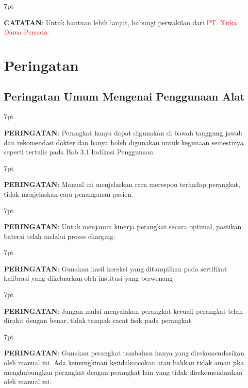 \documentclass[11pt,a4paper,twoside,draft,onecolumn]{book}
\newenvironment{formalred}{%
	\def\FrameCommand{%
		\hspace{1pt}%
		{\color{red}\vrule width 2pt}%
		{\color{formalshade}\vrule width 4pt}%
		\colorbox{formalshade}%
	}%
	\MakeFramed{\advance\hsize-\width\FrameRestore}%
	\noindent\hspace{-4.55pt}%
	\begin{adjustwidth}{}{7pt}%
		\vspace{2pt}\vspace{2pt}%
	}
	{%
		\vspace{2pt}\end{adjustwidth}\endMakeFramed%
}
\newenvironment{formalblue}{%
	\def\FrameCommand{%
		\hspace{1pt}%
		{\color{blue}\vrule width 2pt}%
		{\color{formalshade}\vrule width 4pt}%
		\colorbox{formalshade}%
	}%
	\MakeFramed{\advance\hsize-\width\FrameRestore}%
	\noindent\hspace{-4.55pt}%
	\begin{adjustwidth}{}{7pt}%
		\vspace{2pt}\vspace{2pt}%
	}
	{%
		\vspace{2pt}\end{adjustwidth}\endMakeFramed%
}
\begin{document}
		\begin{formalblue}
			 \textbf{CATATAN}:
			Untuk bantuan lebih lanjut, hubungi perwakilan dari \textcolor{red}{PT. Xirka Dama Persada} 
		\end{formalblue}
		
		\section{Peringatan}\label{sec:2.2}
			\subsection{Peringatan Umum Mengenai Penggunaan Alat}
				\begin{formalred}
					\raisebox{0.125ex}{\resizebox{!}{2ex}{\danger}} \textbf{PERINGATAN}:
					Perangkat hanya dapat digunakan di bawah tanggung jawab dan rekomendasi dokter dan hanya boleh digunakan untuk kegunaan semestinya seperti tertulis pada Bab 3.1 Indikasi Penggunaan. 
				\end{formalred}
			
				\begin{formalred}
					\raisebox{0.125ex}{\resizebox{!}{2ex}{\danger}} \textbf{PERINGATAN}: 
					Manual ini menjelaskan cara merespon terhadap perangkat, tidak menjelaskan cara penanganan pasien. 
				\end{formalred}
			
				\begin{formalred}
					\raisebox{0.125ex}{\resizebox{!}{2ex}{\danger}} \textbf{PERINGATAN}: 
					Untuk menjamin kinerja perangkat secara optimal, pastikan baterai telah melalui proses charging.
				\end{formalred}
				
				\begin{formalred}
					\raisebox{0.125ex}{\resizebox{!}{2ex}{\danger}} \textbf{PERINGATAN}: 
					Gunakan hasil koreksi yang ditampilkan pada sertifikat kalibrasi yang dikeluarkan oleh institusi yang berwenang
				\end{formalred}
			
				\begin{formalred}
					\raisebox{0.125ex}{\resizebox{!}{2ex}{\danger}} \textbf{PERINGATAN}: 
					Jangan mulai menyalakan perangkat kecuali perangkat telah dirakit dengan benar, tidak tampak cacat fisik pada perangkat
				\end{formalred}
			
				\begin{formalred}
					\raisebox{0.125ex}{\resizebox{!}{2ex}{\danger}} \textbf{PERINGATAN}: 
					Gunakan perangkat tambahan hanya yang direkomendasikan oleh manual ini. Ada kemungkinan ketidakcocokan atau bahkan tidak aman jika menghubungkan perangkat dengan perangkat lain yang tidak direkomendasikan oleh manual ini.
				\end{formalred}
			
\end{document}
